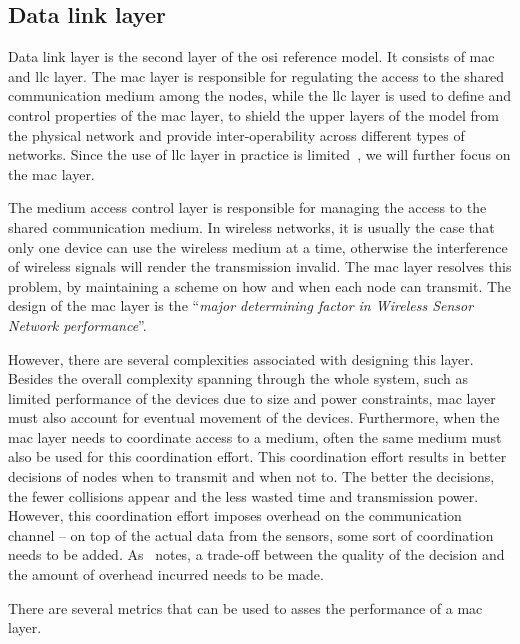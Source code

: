 \subsection{Data link layer}
Data link layer is the second layer of the \acrshort{osi} reference model. It consists of \acrfull{mac} and \acrfull{llc} layer. The \acrshort{mac} layer is responsible for regulating the access to the shared communication medium among the nodes, while the \acrshort{llc} layer is used to define and control properties of the \acrshort{mac} layer, to shield the upper layers of the model from the physical network and provide inter-operability  across different types of networks. Since the use of \acrshort{llc} layer in practice is limited~\cite{Sohraby2007WirelessApplications}, we will further focus on the \acrshort{mac} layer.

The medium access control layer is responsible for managing the access to the shared communication medium. In wireless networks, it is usually the case that only one device can use the wireless medium at a time, otherwise the interference of wireless signals will render the transmission invalid. The \acrshort{mac} layer resolves this problem, by maintaining a scheme on how and when each node can transmit. The design of the \acrshort{mac} layer is the ``\textit{major determining factor in Wireless Sensor Network performance}''\cite{Sohraby2007WirelessApplications}. 

However, there are several complexities associated with designing this layer. Besides the overall complexity spanning through the whole system, such as limited performance of the devices due to size and power constraints, \acrshort{mac} layer must also account for eventual movement of the devices. Furthermore, when the \acrshort{mac} layer needs to coordinate access to a medium, often the same medium must also be used for this coordination effort. This coordination effort results in better decisions of nodes when to transmit and when not to. The better the decisions, the fewer collisions appear and the less wasted time and transmission power. However, this coordination effort imposes overhead on the communication channel -- on top of the actual data from the sensors, some sort of coordination needs to be added. As~\cite{Sohraby2007WirelessApplications} notes, a trade-off between the quality of the decision and the amount of overhead incurred needs to be made.

There are several metrics that can be used to asses the performance of a \acrshort{mac} layer. 

